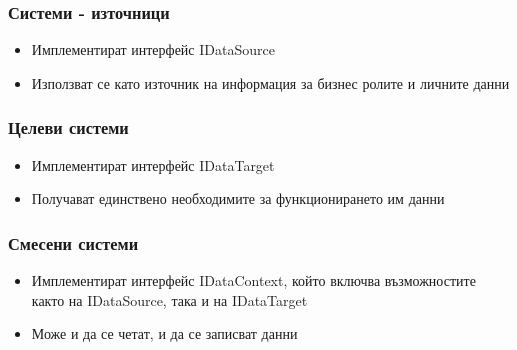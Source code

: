 \documentclass[bulgarian,a4paper,12pt,titlepage]{article}
\begin{document}
            \subsubsection{Системи - източници}
                \begin{itemize}
                    \item Имплементират интерфейс IDataSource
                    \item Използват се като източник на информация за бизнес ролите и личните данни
                \end{itemize}
            \subsubsection{Целеви системи}
                \begin{itemize}
                    \item Имплементират интерфейс IDataTarget
                    \item Получават единствено необходимите за функционирането им данни
                \end{itemize}
            \subsubsection{Смесени системи}
                \begin{itemize}
                    \item Имплементират интерфейс IDataContext, който включва възможностите както на IDataSource, така и на IDataTarget
                    \item Може и да се четат, и да се записват данни
                \end{itemize}
\end{document}
